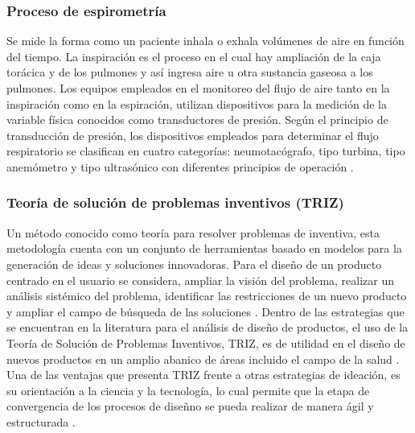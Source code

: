 \documentclass[12pt]{article}
\begin{document}
\subsubsection{Proceso de espirometr\'ia}
Se mide la forma como un paciente inhala o exhala vol\'umenes de aire en funci\'on del tiempo. La inspiraci\'on es el proceso en el cual hay ampliaci\'on de la caja tor\'acica y de los pulmones y as\'i ingresa aire u otra sustancia gaseosa a los pulmones. Los equipos empleados en el monitoreo del flujo de aire tanto en la inspiraci\'on como en la espiraci\'on, utilizan dispositivos para la medici\'on de la variable f\'isica conocidos como transductores de presi\'on. Seg\'un el principio de transducci\'on de presi\'on, los dispositivos empleados para determinar el flujo respiratorio se clasifican en cuatro categor\'ias: neumotac\'ografo, tipo turbina, tipo anem\'ometro y tipo ultras\'onico con diferentes principios de operaci\'on \cite{17}. 



\subsubsection{Teor\'ia de soluci\'on de problemas inventivos (TRIZ)}

Un m\'etodo conocido como teor\'ia para resolver problemas de inventiva, esta metodolog\'ia cuenta con un conjunto de herramientas basado en modelos para la generaci\'on de ideas y soluciones innovadoras. Para el dise\~{n}o de un producto centrado en el usuario se considera, ampliar la visi\'on del problema, realizar un an\'alisis sist\'emico del problema, identificar las restricciones de un nuevo producto y ampliar el campo de b\'usqueda de las soluciones \cite{15}.  Dentro de las estrategias que se encuentran en la literatura para el an\'alisis de dise\~{n}o de productos, el uso de la Teor\'ia de Soluci\'on de Problemas Inventivos, TRIZ, es de utilidad en el dise\~{n}o de nuevos productos en un amplio abanico de \'areas incluido el campo de la salud \cite{16}.  Una de las ventajas que presenta TRIZ frente a otras estrategias de ideaci\'on, es su orientaci\'on a la ciencia y la tecnolog\'ia, lo cual permite que la etapa de convergencia de los procesos de dise\~{n}no se pueda realizar de manera \'agil y estructurada \cite{17}. 






\end{document}
